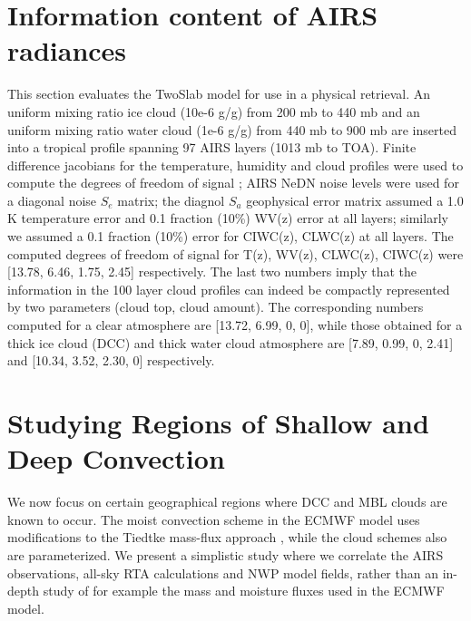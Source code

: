 \documentclass[agupp]{aguplus}              %
\begin{document}
\begin{article}
\section{Information content of AIRS radiances}

This section evaluates the TwoSlab model for use in a physical
retrieval. An uniform mixing ratio ice cloud (10e-6 g/g) from 200 mb
to 440 mb and an uniform mixing ratio water cloud (1e-6 g/g) from 440
mb to 900 mb are inserted into a tropical profile spanning 97 AIRS
layers (1013 mb to TOA). Finite difference jacobians for the
temperature, humidity and cloud profiles were used to compute the
degrees of freedom of signal \citep{rod:00}; AIRS NeDN noise levels
were used for a diagonal noise $S_{e}$ matrix; the diagnol $S_a$
geophysical error matrix assumed a 1.0 K temperature error and 0.1
fraction (10\%) WV(z) error at all layers; similarly we assumed a 0.1
fraction (10\%) error for CIWC(z), CLWC(z) at all layers.  The
computed degrees of freedom of signal for T(z), WV(z), CLWC(z),
CIWC(z) were [13.78, 6.46, 1.75, 2.45] respectively. The last two
numbers imply that the information in the 100 layer cloud profiles can
indeed be compactly represented by two parameters (cloud top, cloud
amount).  The corresponding numbers computed for a clear atmosphere
are [13.72, 6.99, 0, 0], while those obtained for a thick ice cloud
(DCC) and thick water cloud atmosphere are [7.89, 0.99, 0, 2.41] and
[10.34, 3.52, 2.30, 0] respectively.


\section{Studying Regions of Shallow and Deep Convection}

We now focus on certain geographical regions where DCC and MBL clouds
are known to occur. The moist convection scheme in the ECMWF model
uses modifications \cite{bec:14} to the Tiedtke mass-flux approach
\cite{tie:89}, while the cloud schemes also are parameterized. We
present a simplistic study where we correlate the AIRS observations,
all-sky RTA calculations and NWP model fields, rather than an in-depth
study of for example the mass and moisture fluxes used in the ECMWF
model.


\end{article}
\end{document}
